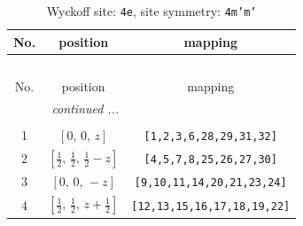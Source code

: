 \documentclass[fleqn,8pt]{jsarticle}
\begin{document}
\renewcommand{\arraystretch}{1.2}
\begin{longtable}{ccc}
\caption{Wyckoff site: {\tt 4e}, site symmetry: {\tt 4m'm'}}
 \\
 \hline \hline
No. & position & mapping \\ \hline \endfirsthead

\multicolumn{2}{l}{\tablename\ \thetable{}} \\
 \hline \hline
No. & position & mapping \\ \hline \endhead

 \hline \hline
\multicolumn{2}{r}{\footnotesize\it continued ...} \\ \endfoot

 \hline \hline
\multicolumn{2}{r}{} \\ \endlastfoot

1 & $\left[ 0,\, 0,\, z \right]$ & {\tt [1,2,3,6,28,29,31,32]} \\ \hline
2 & $\left[ \frac{1}{2},\, \frac{1}{2},\, \frac{1}{2} - z \right]$ & {\tt [4,5,7,8,25,26,27,30]} \\ \hline
3 & $\left[ 0,\, 0,\, - z \right]$ & {\tt [9,10,11,14,20,21,23,24]} \\ \hline
4 & $\left[ \frac{1}{2},\, \frac{1}{2},\, z + \frac{1}{2} \right]$ & {\tt [12,13,15,16,17,18,19,22]} \\
\end{longtable}
\renewcommand{\arraystretch}{1.2}
\end{document}
